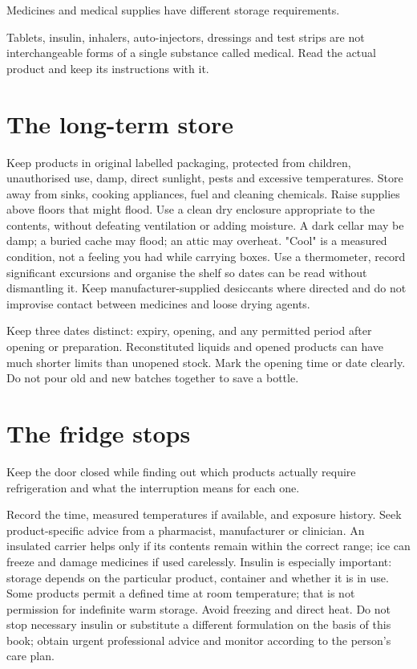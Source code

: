 \documentclass[10pt,openright]{book}
\begin{document}
Medicines and medical supplies have different storage requirements.

Tablets, insulin, inhalers, auto-injectors, dressings and test strips are not interchangeable forms of a single substance called medical. Read the actual product and keep its instructions with it.

\section*{The long-term store}
Keep products in original labelled packaging, protected from children, unauthorised use, damp, direct sunlight, pests and excessive temperatures. Store away from sinks, cooking appliances, fuel and cleaning chemicals. Raise supplies above floors that might flood. Use a clean dry enclosure appropriate to the contents, without defeating ventilation or adding moisture. A dark cellar may be damp; a buried cache may flood; an attic may overheat. "Cool" is a measured condition, not a feeling you had while carrying boxes. Use a thermometer, record significant excursions and organise the shelf so dates can be read without dismantling it. Keep manufacturer-supplied desiccants where directed and do not improvise contact between medicines and loose drying agents.

Keep three dates distinct: expiry, opening, and any permitted period after opening or preparation. Reconstituted liquids and opened products can have much shorter limits than unopened stock. Mark the opening time or date clearly. Do not pour old and new batches together to save a bottle.

\section*{The fridge stops}
Keep the door closed while finding out which products actually require refrigeration and what the interruption means for each one.

Record the time, measured temperatures if available, and exposure history. Seek product-specific advice from a pharmacist, manufacturer or clinician. An insulated carrier helps only if its contents remain within the correct range; ice can freeze and damage medicines if used carelessly. Insulin is especially important: storage depends on the particular product, container and whether it is in use. Some products permit a defined time at room temperature; that is not permission for indefinite warm storage. Avoid freezing and direct heat. Do not stop necessary insulin or substitute a different formulation on the basis of this book; obtain urgent professional advice and monitor according to the person's care plan.
\end{document}
